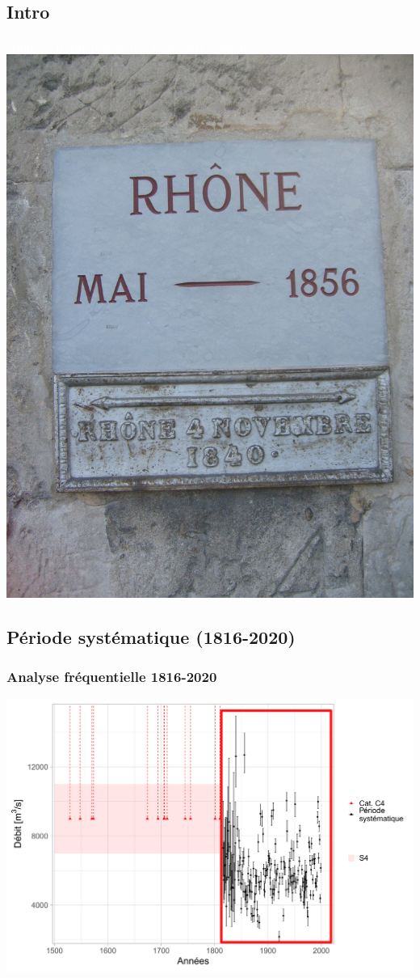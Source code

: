 \documentclass[compress,9pt]{beamer}
\begin{document}
	\subsection{Intro}
	{
    \begin{frame}
        \begin{center}
        	\vfill
		 	\textcolor{white}{\large \textbf{Analyse fréquentielle des crues sur 5 siècles}}\\
		 	\vspace{0.8cm}
		 	\includegraphics[width = .3\textwidth]{./Figures/RepAvi.jpg} 
        \end{center}
    \end{frame}
    }

	\subsection{Période systématique (1816-2020)}
	\begin{frame}
		\frametitle{Analyse fréquentielle 1816-2020}
		\centering
		\includegraphics[width = .7\textwidth]{./Figures/EchMixteC4Bcr1.pdf} 
	\end{frame}
	
\end{document}
